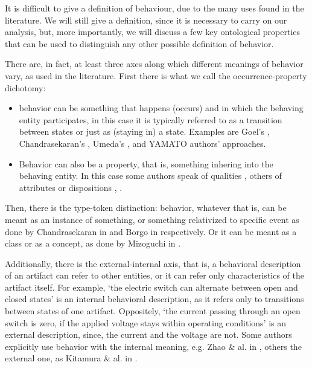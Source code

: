 \documentclass[sw]{iosart2x}
\newcommand{\YAMATO}{\textsc{YAMATO}\xspace}
\newcommand{\TODO}[1]{{\color{red} #1}}
\begin{document}
{%
It is difficult to give a definition of behaviour, due to the many uses found in the literature.
We will still give a definition, since it is necessary to carry on our analysis, but, more importantly, we will discuss a few key ontological properties that can be used to distinguish any other possible definition of behavior.

There are, in fact, at least three axes along which different meanings of behavior vary, as used in the literature.
First there is what we call the occurrence-property dichotomy:
\begin{itemize}
  \item behavior can be something that happens (occurs) and in which the behaving entity participates, 
  in this case it is typically referred to as a transition between states or just as (staying in) a state. 
  Examples are Goel's \cite{goelStructureBehaviorFunction2009}, Chandrasekaran's \cite{chandrasekaranFunctionDeviceRepresentation2000}, Umeda's \cite{umedaFunctionBehaviourStructure1990}, and \YAMATO authors' \cite{mizoguchiFunctionalOntologyArtifacts2009} approaches.
  \item Behavior can also be a property, that is, something inhering into the behaving entity. 
  In this case some authors speak of qualities \cite{borgoFormalOntologicalPerspective2009}, others of attributes or dispositions \cite{vermaasConceptualFrameworkJohn2007}, \cite{geroCategorisingTechnologicalKnowledge2002}.
\end{itemize} 

Then, there is the type-token distinction: behavior, whatever that is, can be meant as an instance of something, or something relativized to specific event as done by Chandrasekaran in \cite{chandrasekaranFunctionDeviceRepresentation2000} and Borgo in \cite{borgoFormalOntologicalPerspective2009} respectively. Or it can be meant as a class or as a concept, as done by Mizoguchi in \cite{mizoguchiFunctionalOntologyArtifacts2009}.

Additionally, there is the external-internal axis, that is, a behavioral description of an artifact can refer to other entities, or it can refer only characteristics of the artifact itself.
For example, `the electric switch can alternate between open and closed states' is an internal behavioral description, as it refers only to transitions between states of one artifact.
Oppositely, `the current passing through an open switch is zero, if the applied voltage stays within operating conditions' is an external description, since, the current and the voltage are not. %
Some authors explicitly use behavior with the internal meaning, e.g. Zhao \& al. in \cite{zhaoStateBehaviorFunction2019}, others the external one, as Kitamura \& al. in \cite{kitamuraOntologybasedSystematizationFunctional2004}.

}
\end{document}
